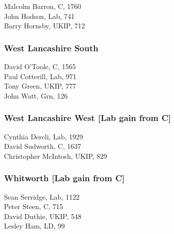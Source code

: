 \documentclass[a4paper,openany,10pt]{book}
\begin{document}


Malcolm Barron, C, 1760\\
John Hodson, Lab, 741\\
Barry Hornsby, UKIP, 712\\


\subsubsection*{West Lancashire South}



David O'Toole, C, 1565\\
Paul Cotterill, Lab, 971\\
Tony Green, UKIP, 777\\
John Watt, Grn, 126\\


\subsubsection*{West Lancashire West \hspace*{\fill}\nolinebreak[1]%
\enspace\hspace*{\fill}
[Lab gain from C]}



Cynthia Dereli, Lab, 1929\\
David Sudworth, C, 1637\\
Christopher McIntosh, UKIP, 829\\


\subsubsection*{Whitworth \hspace*{\fill}\nolinebreak[1]%
\enspace\hspace*{\fill}
[Lab gain from C]}



Sean Serridge, Lab, 1122\\
Peter Steen, C, 715\\
David Duthie, UKIP, 548\\
Lesley Ham, LD, 99\\
\end{document}
